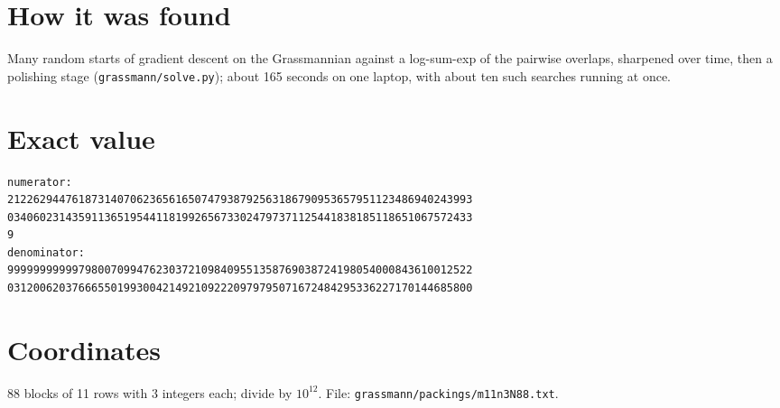 \documentclass[11pt,a4paper]{article}
\begin{document}
\section{How it was found}
Many random starts of gradient descent on the Grassmannian against a log-sum-exp of the pairwise overlaps, sharpened over time, then a polishing stage (\texttt{grassmann/solve.py}); about 165 seconds on one laptop, with about ten such searches running at once.


\appendix
\section{Exact value}
{\small
\begin{verbatim}
numerator:
212262944761873140706236561650747938792563186790953657951123486940243993
034060231435911365195441181992656733024797371125441838185118651067572433
9
denominator:
999999999997980070994762303721098409551358769038724198054000843610012522
031200620376665501993004214921092220979795071672484295336227170144685800
\end{verbatim}}

\section{Coordinates}
88 blocks of 11 rows with 3 integers each; divide by $10^{12}$. File: \texttt{grassmann/packings/m11n3N88.txt}.
{\tiny
\begin{multicols}{3}
\end{multicols}}
\end{document}
